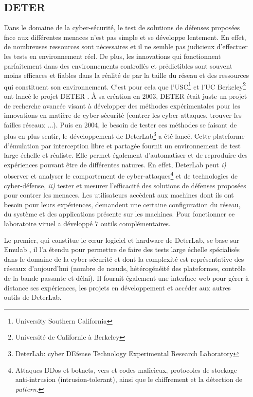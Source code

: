 \subsection{DETER}
\label{subsection:DETER}

Dans le domaine de la cyber-sécurité, le test de solutions de défenses proposées
face aux différentes menaces n'est pas simple et se développe lentement. En
effet, de nombreuses ressources sont nécessaires et il ne semble pas judicieux
d'effectuer les tests en environnement réel. De plus, les innovations qui
fonctionnent parfaitement dans des environnements controllés et prédictibles
sont souvent moins efficaces et fiables dans la réalité de par la taille du
réseau et des ressources qui constituent son environnement.  C'est pour cela que
l'USC\footnote{University Southern California} et l'UC
Berkeley\footnote{Université de Californie à Berkeley} ont lancé le projet DETER
\citep{DETER_Project, DETER_benzel2011science, DETER_mirkovic2010deter}. À sa
création en 2003, DETER était juste un projet de recherche avancée visant à
développer des méthodes expérimentales pour les innovations en matière de
cyber-sécurité (contrer les cyber-attaques, trouver les failles réseaux
...). Puis en 2004, le besoin de tester ces méthodes se faisant de plus en plus
sentir, le développement de DeterLab\footnote{DeterLab: cyber DEfense Technology
  Experimental Research Laboratory} a été lancé. Cette plateforme d'émulation
par interception libre et partagée fournit un environnement de test large
échelle et réaliste. Elle permet également d'automatiser et de reproduire des
expériences pouvant être de différentes natures. En effet, DeterLab peut
\textit{i)} observer et analyser le comportement de cyber-attaques\footnote{
  Attaques DDos et botnets, vers et codes malicieux, protocoles de stockage
  anti-intrusion (intrusion-tolerant), ainsi que le chiffrement et la détection
  de \textit{pattern}.} et de technologies de cyber-défense, \textit{ii)} tester et
mesurer l'efficacité des solutions de défenses proposées pour contrer les
menaces. Les utilisateurs accèdent aux machines dont ils ont besoin pour leurs
expériences, demandent une certaine configuration du réseau, du système et des
applications présente sur les machines. Pour fonctionner ce laboratoire viruel a
développé 7 outils complémentaires.

Le premier, qui constitue le c\oe ur logiciel et hardware de DeterLab,
se base sur Emulab \citep{EMULAB_INIT}, il l'a étendu pour permettre
de faire des tests large échelle spécialisés dans le domaine de la
cyber-sécurité et dont la complexité est représentative des réseaux
d'aujourd'hui (nombre de n\oe uds, hétérogénéité des plateformes,
contrôle de la bande passante et délai). Il fournit également une
interface web pour gérer à distance ses expériences, les projets en
développement et accéder aux autres outils de DeterLab.

